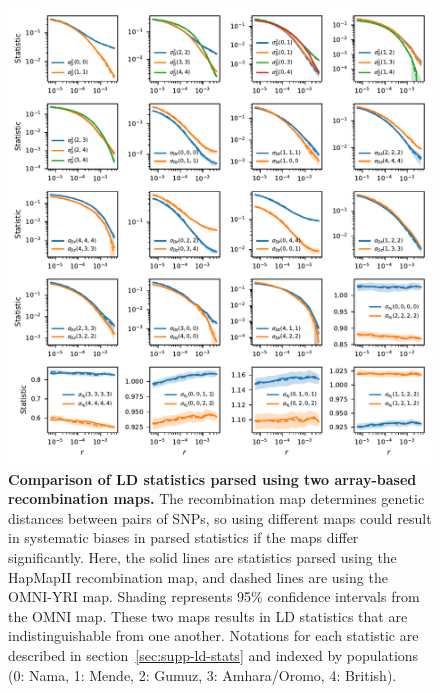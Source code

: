 \documentclass[]{article}
\begin{document}
\begin{figure}[ht]
    \centering
    \includegraphics{figures/supp-omni-hapmap-comparison.pdf}
    \caption{
        \textbf{Comparison of LD statistics parsed using two array-based
        recombination maps.}
        The recombination map determines genetic distances between pairs of SNPs,
        so using different maps could result in systematic biases in parsed
        statistics if the maps differ significantly. Here, the solid lines are
        statistics parsed using the HapMapII recombination map, and dashed lines
        are using the OMNI-YRI map. Shading represents 95\% confidence intervals
        from the OMNI map. These two maps results in LD statistics that are
        indistinguishable from one another. Notations for each statistic are
        described in section~\ref{sec:supp-ld-stats} and indexed by populations
        (0: Nama, 1: Mende, 2: Gumuz, 3: Amhara/Oromo, 4: British).
    }
    \label{fig:supp-omni-hapmap-comparison}
\end{figure}
\end{document}
